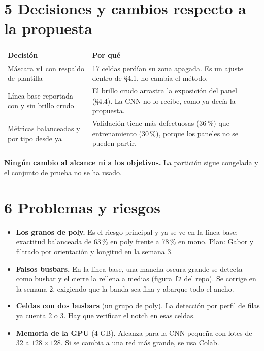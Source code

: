 \documentclass[11pt,a4paper]{article}
\begin{document}
\FloatBarrier
\section*{5 \quad Decisiones y cambios respecto a la propuesta}

\begin{table}[!htbp]
\centering\small
\begin{tabularx}{\textwidth}{@{}>{\raggedright}p{4.2cm} X@{}}
\toprule
Decisión & Por qué \\
\midrule
Máscara v1 con respaldo de plantilla & 17 celdas perdían su zona apagada. Es un ajuste dentro de §4.1, no cambia el método. \\
Línea base reportada con y sin brillo crudo & El brillo crudo arrastra la exposición del panel (§4.4). La CNN no lo recibe, como ya decía la propuesta. \\
Métricas balanceadas y por tipo desde ya & Validación tiene más defectuosas (36\,\%) que entrenamiento (30\,\%), porque los paneles no se pueden partir. \\
\bottomrule
\end{tabularx}
\end{table}

\textbf{Ningún cambio al alcance ni a los objetivos.} La partición sigue congelada y el conjunto de prueba no se ha usado.

\section*{6 \quad Problemas y riesgos}

\begin{itemize}[leftmargin=14pt]
  \item \textbf{Los granos de poly.} Es el riesgo principal y ya se ve en la línea base: exactitud balanceada de 63\,\% en poly frente a 78\,\% en mono.
        Plan: Gabor y filtrado por orientación y longitud en la semana 3.
  \item \textbf{Falsos busbars.} En la línea base, una mancha oscura grande se detecta como busbar y el cierre la rellena a medias (figura \texttt{f2} del repo).
        Se corrige en la semana 2, exigiendo que la banda sea fina y abarque todo el ancho.
  \item \textbf{Celdas con dos busbars} (un grupo de poly). La detección por perfil de filas ya cuenta 2 o 3. Hay que verificar el notch en esas celdas.
  \item \textbf{Memoria de la GPU} (4 GB). Alcanza para la CNN pequeña con lotes de 32 a $128\times128$. Si se cambia a una red más grande, se usa Colab.
\end{itemize}
\end{document}
